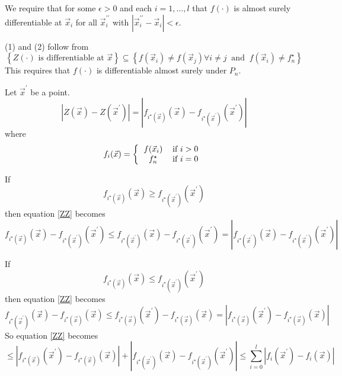 \documentclass[phd,tocprelim]{cornell}
\begin{document}
We require that for some $\epsilon > 0$ and each $i = 1, \ldots, l$ that $f(\cdot)$ is almost surely differentiable at $\vec{x}_{i}$ for all $\vec{x}_{i}^{\prime\prime}$ with $|\vec{x}_{i}^{\prime\prime} - \vec{x}_{i}| < \epsilon$.

(1) and (2) follow from
\begin{equation}
    \left\{Z(\cdot) \text{ is differentiable at } \vec{x}\right\} \subseteq \left\{f(\vec{x}_{i}) \neq f(\vec{x}_{j}) \forall i \neq j \ \text{ and } \ f(\vec{x}_{i}) \neq f_{n}^{\star} \right\}
\end{equation}
This requires that $f(\cdot)$ is differentiable almost surely under $P_{n}$.

Let $\vec{x}^{\prime}$ be a point.
\begin{equation}
    \left|Z(\vec{x}) - Z(\vec{x}^{\prime})\right| = \left|f_{i^{\star}(\vec{x})}(\vec{x}) - f_{i^{\star}(\vec{x}^{\prime})}(\vec{x}^{\prime})\right|
    \label{ZZ}
\end{equation}
where
\begin{equation}
    f_{i}(\vec{x}) = \left\{ \begin{tabular}{cc}
        $f(\vec{x}_{i})$ & if $i > 0$ \\
        $f_{n}^{\star}$ & if $i = 0$
    \end{tabular} \right.
\end{equation}

If
\begin{equation}
    f_{i^{\star}(\vec{x})}(\vec{x}) \geq f_{i^{\star}(\vec{x}^{\prime})}(\vec{x}^{\prime})
\end{equation}
then equation \ref{ZZ} becomes
\begin{equation}
    f_{i^{\star}(\vec{x})}(\vec{x}) - f_{i^{\star}(\vec{x}^{\prime})}(\vec{x}^{\prime}) \leq f_{i^{\star}(\vec{x}^{\prime})}(\vec{x}) - f_{i^{\star}(\vec{x}^{\prime})}(\vec{x}^{\prime}) = \left|f_{i^{\star}(\vec{x}^{\prime})}(\vec{x}) - f_{i^{\star}(\vec{x}^{\prime})}(\vec{x}^{\prime})\right|
\end{equation}

If
\begin{equation}
    f_{i^{\star}(\vec{x})}(\vec{x}) \leq f_{i^{\star}(\vec{x}^{\prime})}(\vec{x}^{\prime})
\end{equation}
then equation \ref{ZZ} becomes
\begin{equation}
    f_{i^{\star}(\vec{x}^{\prime})}(\vec{x}) - f_{i^{\star}(\vec{x})}(\vec{x}) \leq f_{i^{\star}(\vec{x})}(\vec{x}^{\prime}) - f_{i^{\star}(\vec{x})}(\vec{x}) = \left|f_{i^{\star}(\vec{x})}(\vec{x}^{\prime}) - f_{i^{\star}(\vec{x})}(\vec{x})\right|
\end{equation}
So equation \ref{ZZ} becomes
\begin{equation}
    \leq \left|f_{i^{\star}(\vec{x})}(\vec{x}^{\prime}) - f_{i^{\star}(\vec{x})}(\vec{x})\right| + \left|f_{i^{\star}(\vec{x}^{\prime})}(\vec{x}) - f_{i^{\star}(\vec{x}^{\prime})}(\vec{x}^{\prime})\right| \leq \sum_{i=0}^{l} \left|f_{i}(\vec{x}^{\prime}) - f_{i}(\vec{x})\right|
\end{equation}
\end{document}
